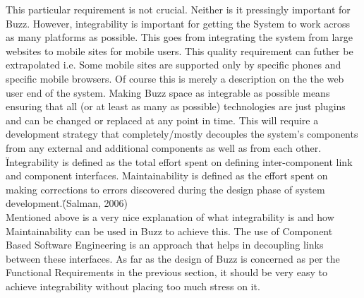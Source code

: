 This particular requirement is not crucial. Neither is it pressingly important for Buzz. However, integrability is important for getting the System to work across as many platforms as possible. This goes from integrating the system from large websites to mobile sites for mobile users. This quality requirement can futher be extrapolated i.e. Some mobile sites are supported only by specific phones and specific mobile browsers. Of course this is merely a description on the the web user end of the system. Making Buzz space as integrable as possible means ensuring that all (or at least as many as possible) technologies are just plugins and can be changed or replaced at any point in time. This will require a development strategy that completely/mostly decouples the system's components from any external and additional components as well as from each other.\\

\"Integrability is defined as the total effort spent on defining inter-component link and component interfaces.  Maintainability is defined as the effort spent on making corrections to errors discovered during the design phase of system development.\" (Salman, 2006)\\

Mentioned above is a very nice explanation of what integrability is and how Maintainability can be used in Buzz to achieve this. The use of Component Based Software Engineering is an approach that helps in decoupling links between these interfaces. As far as the design of Buzz is concerned as per the Functional Requirements in the previous section, it should be very easy to achieve integrability without placing too much stress on it.\\



